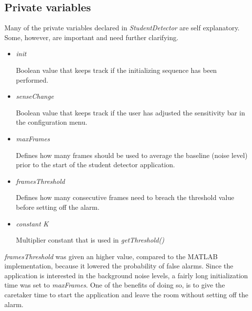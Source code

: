 \subsection{Private variables}
Many of the private variables declared in \emph{StudentDetector} are self
explanatory. Some, however, are important and need further clarifying.

\begin{itemize}
\item \emph{init}
	
	Boolean value that keeps track if the initializing sequence has been
	performed.
\item \emph{senseChange}

	Boolean value that keeps track if the user has adjusted the sensitivity
	bar in the configuration menu.
\item \emph{maxFrames}

	Defines how many frames should be used to average the baseline (noise
	level) prior to the start of the student detector application.
\item \emph{framesThreshold}

	Defines how many consecutive frames need to breach the threshold value
	before setting off the alarm.
\item \emph{constant K}
	
	Multiplier constant that is used in \emph{getThreshold()}
\end{itemize}

\emph{framesThreshold} was given an higher value, compared to the MATLAB
implementation, because it lowered the probability of false alarms. Since the
application is interested in the background noise levels, a fairly long
initialization time was set to \emph{maxFrames}. One of the benefits of doing
so, is to give the caretaker time to start the application and leave the room 
without setting off the alarm.

